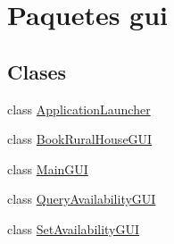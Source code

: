 \hypertarget{namespacegui}{}\section{Paquetes gui}
\label{namespacegui}
\subsection*{Clases}
\begin{DoxyCompactItemize}
\item 
class \mbox{\hyperlink{classgui_1_1_application_launcher}{Application\+Launcher}}
\item 
class \mbox{\hyperlink{classgui_1_1_book_rural_house_g_u_i}{Book\+Rural\+House\+G\+UI}}
\item 
class \mbox{\hyperlink{classgui_1_1_main_g_u_i}{Main\+G\+UI}}
\item 
class \mbox{\hyperlink{classgui_1_1_query_availability_g_u_i}{Query\+Availability\+G\+UI}}
\item 
class \mbox{\hyperlink{classgui_1_1_set_availability_g_u_i}{Set\+Availability\+G\+UI}}
\end{DoxyCompactItemize}
